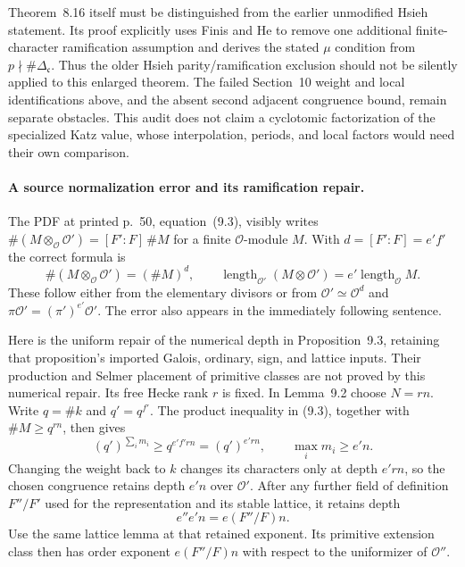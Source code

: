 Theorem~8.16 itself must be distinguished from the earlier unmodified
Hsieh statement.  Its proof explicitly uses Finis and He to remove
one additional finite-character ramification assumption and derives
the stated $\mu$ condition from $p\nmid\#\Delta_{\mathfrak c}$.
Thus the older Hsieh parity/ramification exclusion should not be
silently applied to this enlarged theorem.  The failed Section~10
weight and local identifications above, and the absent second
adjacent congruence bound, remain separate obstacles.  This audit
does not claim a cyclotomic factorization of the specialized Katz
value, whose interpolation, periods, and local factors would need
their own comparison.

\paragraph{A source normalization error and its ramification repair.}
The PDF at printed p.~50, equation~(9.3), visibly writes
$\#(M\otimes_{\mathcal O}\mathcal O')=[F':F]\,\#M$ for a
finite $\mathcal O$-module $M$.  With $d=[F':F]=e'f'$ the correct
formula is
\[
 \#(M\otimes_{\mathcal O}\mathcal O')=(\#M)^d,\qquad
 \operatorname{length}_{\mathcal O'}(M\otimes\mathcal O')
       =e'\operatorname{length}_{\mathcal O}M.                \tag{AF.10}
\]
These follow either from the elementary divisors or from
$\mathcal O'\simeq\mathcal O^d$ and
$\pi\mathcal O'=(\pi')^{e'}\mathcal O'$.
The error also appears in the immediately following sentence.

Here is the uniform repair of the numerical depth in Proposition~9.3,
retaining that proposition's imported Galois, ordinary, sign, and
lattice inputs.  Their production and Selmer placement of primitive
classes are not proved by this numerical repair.  Its free Hecke
rank $r$ is fixed.  In Lemma~9.2 choose
$N=rn$.  Write $q=\#k$ and $q'=q^{f'}$.  The product inequality
in (9.3), together with $\#M\geq q^{rn}$, then gives
\[
 (q')^{\sum_i m_i}\geq q^{e'f'rn}
       =(q')^{e'rn},\qquad \max_i m_i\geq e'n.               \tag{AF.11}
\]
Changing the weight back to $k$ changes its characters only at depth
$e'rn$, so the chosen congruence retains depth $e'n$ over
$\mathcal O'$.  After any further field of definition $F''/F'$
used for the representation and its stable lattice, it retains depth
\[
 e''e'n=e(F''/F)n.                                          \tag{AF.12}
\]
Use the same lattice lemma at that retained exponent.  Its primitive
extension class then has order exponent $e(F''/F)n$ with respect to
the uniformizer of $\mathcal O''$.

